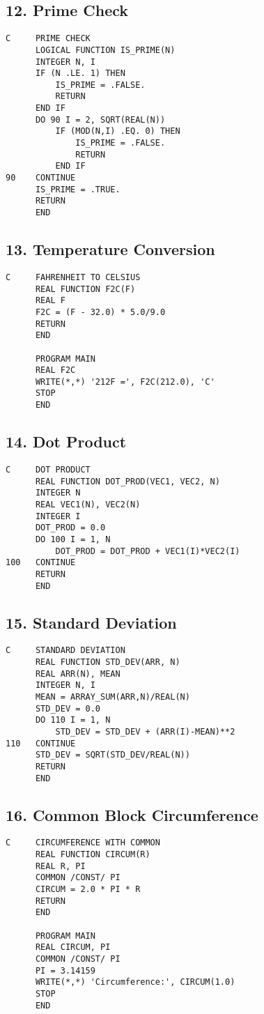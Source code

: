 \documentclass{book}
\begin{document}
\subsection*{12. Prime Check}
\begin{verbatim}
C     PRIME CHECK
      LOGICAL FUNCTION IS_PRIME(N)
      INTEGER N, I
      IF (N .LE. 1) THEN
          IS_PRIME = .FALSE.
          RETURN
      END IF
      DO 90 I = 2, SQRT(REAL(N))
          IF (MOD(N,I) .EQ. 0) THEN
              IS_PRIME = .FALSE.
              RETURN
          END IF
90    CONTINUE
      IS_PRIME = .TRUE.
      RETURN
      END
\end{verbatim}

\subsection*{13. Temperature Conversion}
\begin{verbatim}
C     FAHRENHEIT TO CELSIUS
      REAL FUNCTION F2C(F)
      REAL F
      F2C = (F - 32.0) * 5.0/9.0
      RETURN
      END

      PROGRAM MAIN
      REAL F2C
      WRITE(*,*) '212F =', F2C(212.0), 'C'
      STOP
      END
\end{verbatim}

\subsection*{14. Dot Product}
\begin{verbatim}
C     DOT PRODUCT
      REAL FUNCTION DOT_PROD(VEC1, VEC2, N)
      INTEGER N
      REAL VEC1(N), VEC2(N)
      INTEGER I
      DOT_PROD = 0.0
      DO 100 I = 1, N
          DOT_PROD = DOT_PROD + VEC1(I)*VEC2(I)
100   CONTINUE
      RETURN
      END
\end{verbatim}

\subsection*{15. Standard Deviation}
\begin{verbatim}
C     STANDARD DEVIATION
      REAL FUNCTION STD_DEV(ARR, N)
      REAL ARR(N), MEAN
      INTEGER N, I
      MEAN = ARRAY_SUM(ARR,N)/REAL(N)
      STD_DEV = 0.0
      DO 110 I = 1, N
          STD_DEV = STD_DEV + (ARR(I)-MEAN)**2
110   CONTINUE
      STD_DEV = SQRT(STD_DEV/REAL(N))
      RETURN
      END
\end{verbatim}

\subsection*{16. Common Block Circumference}
\begin{verbatim}
C     CIRCUMFERENCE WITH COMMON
      REAL FUNCTION CIRCUM(R)
      REAL R, PI
      COMMON /CONST/ PI
      CIRCUM = 2.0 * PI * R
      RETURN
      END

      PROGRAM MAIN
      REAL CIRCUM, PI
      COMMON /CONST/ PI
      PI = 3.14159
      WRITE(*,*) 'Circumference:', CIRCUM(1.0)
      STOP
      END
\end{verbatim}
\end{document}
